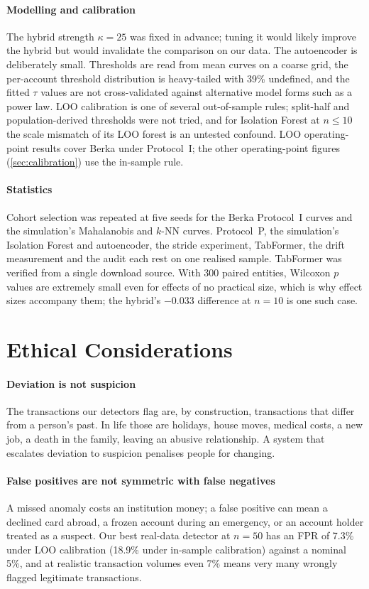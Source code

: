 \paragraph{Modelling and calibration}
The hybrid strength $\kappa=25$ was fixed in advance; tuning it would likely improve the hybrid but would invalidate the comparison on our data. The autoencoder is deliberately small. Thresholds are read from mean curves on a coarse grid, the per-account threshold distribution is heavy-tailed with 39\% undefined, and the fitted $\tau$ values are not cross-validated against alternative model forms such as a power law. LOO calibration is one of several out-of-sample rules; split-half and population-derived thresholds were not tried, and for Isolation Forest at $n\le10$ the scale mismatch of its LOO forest is an untested confound. LOO operating-point results cover Berka under Protocol~I; the other operating-point figures (\cref{sec:calibration}) use the in-sample rule.

\paragraph{Statistics}
Cohort selection was repeated at five seeds for the Berka Protocol~I curves and the simulation's Mahalanobis and $k$-NN curves. Protocol~P, the simulation's Isolation Forest and autoencoder, the stride experiment, TabFormer, the drift measurement and the audit each rest on one realised sample. TabFormer was verified from a single download source. With 300 paired entities, Wilcoxon $p$ values are extremely small even for effects of no practical size, which is why effect sizes accompany them; the hybrid's $-0.033$ difference at $n=10$ is one such case.

\section{Ethical Considerations}\label{sec:ethics}

\paragraph{Deviation is not suspicion}
The transactions our detectors flag are, by construction, transactions that differ from a person's past. In life those are holidays, house moves, medical costs, a new job, a death in the family, leaving an abusive relationship. A system that escalates deviation to suspicion penalises people for changing.

\paragraph{False positives are not symmetric with false negatives}
A missed anomaly costs an institution money; a false positive can mean a declined card abroad, a frozen account during an emergency, or an account holder treated as a suspect. Our best real-data detector at $n=50$ has an FPR of 7.3\% under LOO calibration (18.9\% under in-sample calibration) against a nominal 5\%, and at realistic transaction volumes even 7\% means very many wrongly flagged legitimate transactions.


